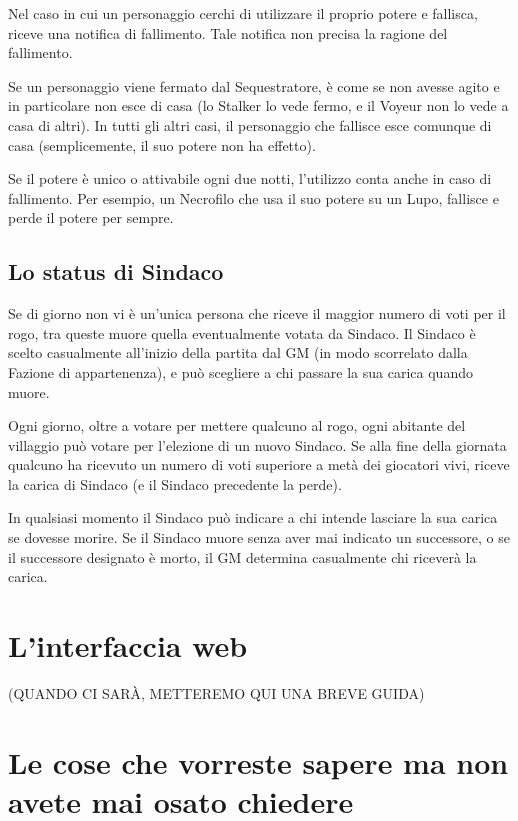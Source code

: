 \documentclass[a4paper,10pt]{article}
\begin{document}
Nel caso in cui un personaggio cerchi di utilizzare il proprio potere e fallisca, riceve una notifica di fallimento. Tale notifica non precisa la ragione del fallimento.

Se un personaggio viene fermato dal Sequestratore, è come se non avesse agito e in particolare non esce di casa (lo Stalker lo vede fermo, e il Voyeur non lo vede a casa di altri).
In tutti gli altri casi, il personaggio che fallisce esce comunque di casa (semplicemente, il suo potere non ha effetto).

Se il potere è unico o attivabile ogni due notti, l'utilizzo conta anche in caso di fallimento. Per esempio, un Necrofilo che usa il suo potere su un Lupo, fallisce e perde il potere per sempre.

\subsection{Lo status di Sindaco}
\label{sindaco}

Se di giorno non vi è un'unica persona che riceve il maggior numero di voti per il rogo, tra queste muore quella eventualmente votata da Sindaco.
Il Sindaco è scelto casualmente all'inizio della partita dal GM (in modo scorrelato dalla Fazione di appartenenza), e può scegliere a chi passare la sua carica quando muore.

Ogni giorno, oltre a votare per mettere qualcuno al rogo, ogni abitante del villaggio può votare per l'elezione di un nuovo Sindaco. Se alla fine della giornata qualcuno ha ricevuto un numero di voti superiore a metà dei giocatori vivi, riceve la carica di Sindaco (e il Sindaco precedente la perde).

In qualsiasi momento il Sindaco può indicare a chi intende lasciare la sua carica se dovesse morire. Se il Sindaco muore senza aver mai indicato un successore, o se il successore designato è morto, il GM determina casualmente chi riceverà la carica.


\pagebreak
\section{L'interfaccia web}
(QUANDO CI SARÀ, METTEREMO QUI UNA BREVE GUIDA)



\section{Le cose che vorreste sapere ma non avete mai osato chiedere}
\label{faq}
\end{document}
